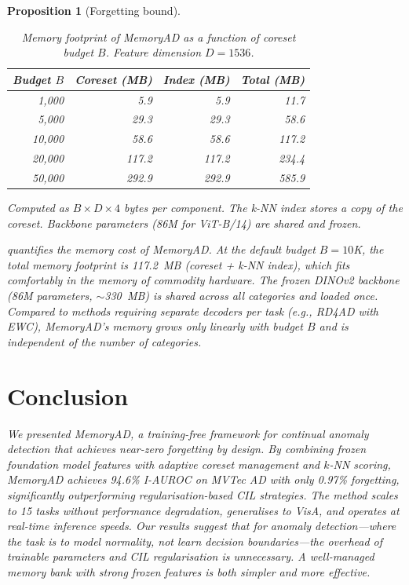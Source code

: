 \documentclass[conference]{IEEEtran}
\newcommand{\method}{MemoryAD}
\newcommand{\eg}{\textit{e.g.}}
\newtheorem{proposition}{Proposition}
\begin{document}
\begin{proposition}[Forgetting bound]
\begin{table}[htbp]
\centering
\caption{Memory footprint of \method{} as a function of coreset budget $B$. Feature dimension $D=1536$.}
\label{tab:memory_footprint}
\begin{threeparttable}
\begin{tabular}{rrrr}
\toprule
Budget $B$ & Coreset (MB) & Index (MB) & Total (MB) \\
\midrule
1{,}000   &  5.9  &  5.9  &  11.7 \\
5{,}000   & 29.3  & 29.3  &  58.6 \\
10{,}000  & 58.6  & 58.6  & 117.2 \\
20{,}000  & 117.2 & 117.2 & 234.4 \\
50{,}000  & 292.9 & 292.9 & 585.9 \\
\bottomrule
\end{tabular}
\begin{tablenotes}
\item Computed as $B \times D \times 4$ bytes per component. The k-NN index stores a copy of the coreset. Backbone parameters (86M for ViT-B/14) are shared and frozen.
\end{tablenotes}
\end{threeparttable}
\end{table}

 quantifies the memory cost of \method{}. At the default budget $B{=}10$K, the total memory footprint is 117.2~MB (coreset + k-NN index), which fits comfortably in the memory of commodity hardware. The frozen DINOv2 backbone (86M parameters, $\sim$330~MB) is shared across all categories and loaded once. Compared to methods requiring separate decoders per task (\eg, RD4AD with EWC), \method{}'s memory grows only linearly with budget $B$ and is independent of the number of categories.

\section{Conclusion}

We presented \method{}, a training-free framework for continual anomaly detection that achieves near-zero forgetting by design. By combining frozen foundation model features with adaptive coreset management and $k$-NN scoring, \method{} achieves 94.6\% I-AUROC on MVTec AD with only 0.97\% forgetting, significantly outperforming regularisation-based CIL strategies. The method scales to 15 tasks without performance degradation, generalises to VisA, and operates at real-time inference speeds. Our results suggest that for anomaly detection---where the task is to model normality, not learn decision boundaries---the overhead of trainable parameters and CIL regularisation is unnecessary. A well-managed memory bank with strong frozen features is both simpler and more effective.


\end{proposition}
\end{document}
